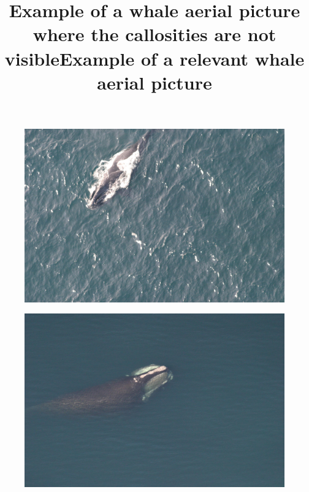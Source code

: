 \documentclass[11pt,a4paper,oneside]{report}
\begin{document}
\begin{appendices}
\begin{figure}[H]
	\includegraphics[scale=0.1]{invisible.jpg}
	\centering
	\title{Example of a whale aerial picture where the callosities are not visible}
\end{figure}

\begin{figure}[H]
	\includegraphics[scale=0.15]{better.jpg}
	\centering
	\title{Example of a relevant whale aerial picture}
\end{figure}

\end{appendices}
\end{document}
